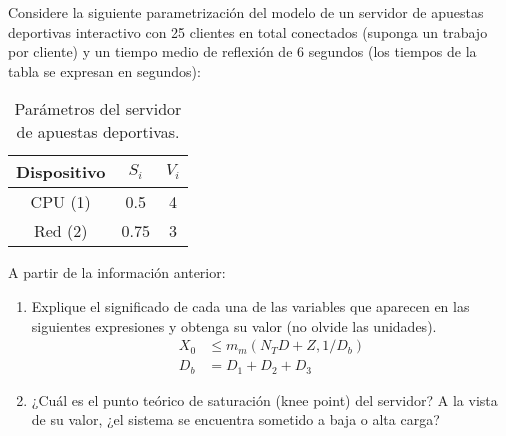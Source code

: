 \begin{ejercicio}\label{ej:5.27}
    Considere la siguiente parametrización del modelo de un servidor de apuestas deportivas interactivo con 25 clientes en total conectados (suponga un trabajo por cliente) y un tiempo medio de reflexión de 6 segundos (los tiempos de la tabla se expresan en segundos):
    \begin{table}[h]
        \centering
        \begin{tabular}{|c|c|c|}
            \hline
            Dispositivo & $S_i$ & $V_i$ \\
            \hline
            CPU (1) & 0.5 & 4 \\
            Red (2) & 0.75 & 3 \\
            \hline
        \end{tabular}
        \caption{Parámetros del servidor de apuestas deportivas.}
        \label{tab:5.27}
    \end{table}
    A partir de la información anterior:
    \begin{enumerate}
        \item Explique el significado de cada una de las variables que aparecen en las siguientes expresiones y obtenga su valor (no olvide las unidades).
        \begin{align*}
            X_0 &\leq m_m \left( N_T D + Z, 1 / D_b \right) \\
            D_b &= D_1 + D_2 + D_3
        \end{align*}
        \item ¿Cuál es el punto teórico de saturación (knee point) del servidor? A la vista de su valor, ¿el sistema se encuentra sometido a baja o alta carga?
    \end{enumerate}
\end{ejercicio}
\begin{comment}
\solucion
    \begin{enumerate}
        \item $N_T = 25$ clientes; $D = 4.25$ s/petición al servidor (suma de demandas de servicio); $Z = 6$ s (tiempo medio de reflexión de los clientes); $D_b = 2.25$ s/petición al servidor (demanda de servicio del cuello de botella, en nuestro caso: la red). Entonces, $X_0 \leq 0.44$ peticiones al servidor por segundo (productividad del servidor).
        \item El punto teórico de saturación es $N_T^* = 4.6$ clientes. Como $N_T >> N_T^*$ el servidor se encuentra sometido a alta carga. Por lo tanto, $X_0$ será un valor próximo, aunque inferior, a 0.44 peticiones/s.
    \end{enumerate}
\end{comment}

